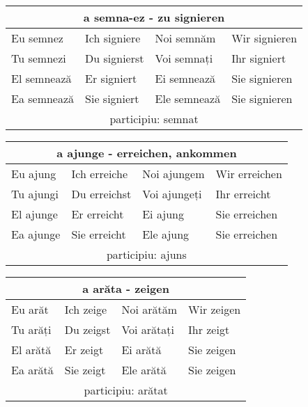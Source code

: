 \documentclass[11pt, oneside]{article}
\begin{document}
%
\begin{center}
  \begin{tabular}{ |p{3.25cm}|p{3.25cm}||p{3.25cm}|p{3.25cm}| }
      \hline
      \multicolumn{4}{|c|}{a semna-ez - zu signieren} \\
      \hline
      \hline
      Eu semnez & Ich signiere & Noi semnăm & Wir signieren\\
      \hline
      Tu semnezi & Du signierst & Voi semnați & Ihr signiert\\
      \hline
      El semnează & Er signiert & Ei semnează & Sie signieren\\ 
      Ea semnează & Sie signiert & Ele semnează & Sie signieren\\
      \hline
      \multicolumn{4}{|c|}{participiu: semnat} \\
      \hline
     \end{tabular}
\end{center}
%
\begin{center}
  \begin{tabular}{ |p{3.25cm}|p{3.25cm}||p{3.25cm}|p{3.25cm}| }
      \hline
      \multicolumn{4}{|c|}{a ajunge - erreichen, ankommen} \\
      \hline
      \hline
      Eu ajung & Ich erreiche & Noi ajungem & Wir erreichen\\
      \hline
      Tu ajungi & Du erreichst & Voi ajungeți & Ihr erreicht\\
      \hline
      El ajunge & Er erreicht & Ei ajung & Sie erreichen\\ 
      Ea ajunge & Sie erreicht & Ele ajung & Sie erreichen\\
      \hline
      \multicolumn{4}{|c|}{participiu: ajuns} \\
      \hline
     \end{tabular}
\end{center}
%
\begin{center}
  \begin{tabular}{ |p{3.25cm}|p{3.25cm}||p{3.25cm}|p{3.25cm}| }
      \hline
      \multicolumn{4}{|c|}{a arăta - zeigen} \\
      \hline
      \hline
      Eu arăt & Ich zeige & Noi arătăm & Wir zeigen\\
      \hline
      Tu arăți & Du zeigst & Voi arătați & Ihr zeigt\\
      \hline
      El arătă & Er zeigt & Ei arătă & Sie zeigen\\ 
      Ea arătă & Sie zeigt & Ele arătă & Sie zeigen\\
      \hline
      \multicolumn{4}{|c|}{participiu: arătat} \\
      \hline
     \end{tabular}
\end{center}
\end{document}
